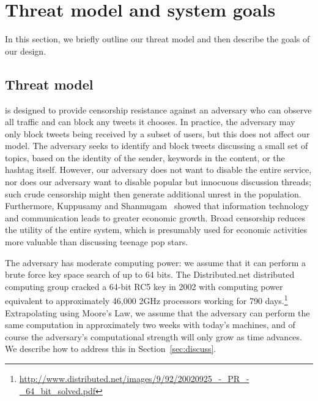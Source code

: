 \section{Threat model and system goals}

In this section, we briefly outline our threat model and then describe
the goals of our design.

\subsection{Threat model} \label{sec:threat}
\hoot is designed to provide censorship resistance against an adversary
who can observe all \hoot traffic and can block any tweets it chooses. In
practice, the adversary may only block tweets being received by a subset of users,
but this does not affect our model. The adversary seeks to identify and
block tweets discussing a small set of topics, based on the identity of
the sender, keywords in the content, or the hashtag itself. However,
our adversary does not want to disable the entire service, nor does
our adversary want to disable popular but innocuous discussion
threads; such crude censorship might
then generate additional unrest in the population. 
Furthermore, Kuppusamy and Shanmugam~\cite{ict-economy} showed that information technology 
and communication leads to greater economic growth. Broad censorship 
reduces the utility of the entire system, which is presumably used for
economic activities more valuable than discussing teenage pop stars.


The adversary has moderate computing power: we assume that it can
perform a brute force key space search of up to 64 bits. The
Distributed.net distributed computing group cracked a 64-bit RC5 key in
2002 with computing power equivalent to approximately 46,000 2GHz
processors working for 790
days.\footnote{\url{http://www.distributed.net/images/9/92/20020925_-_PR_-_64_bit_solved.pdf}}
Extrapolating using Moore's Law, we assume that the adversary can
perform the same computation in approximately two weeks with today's
machines, and of course the adversary's computational strength will
only grow as time advances. We describe how
to address this in Section~\ref{sec:discuss}.

